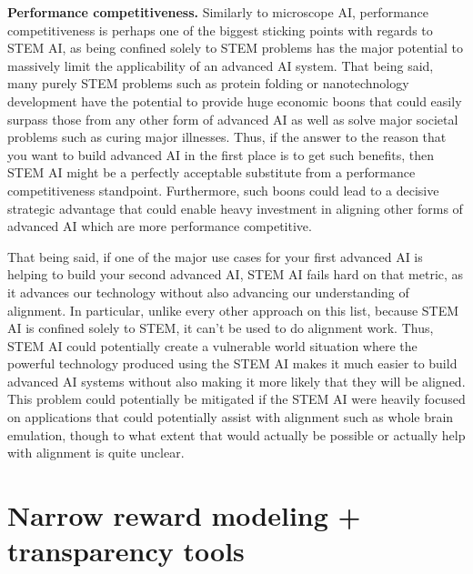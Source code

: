 \textbf{Performance competitiveness.} Similarly to microscope AI, performance competitiveness is perhaps one of the biggest sticking points with regards to STEM AI, as being confined solely to STEM problems has the major potential to massively limit the applicability of an advanced AI system. That being said, many purely STEM problems such as protein folding\cite{TODO: cite https://en.wikipedia.org/wiki/Protein_folding} or nanotechnology development\cite{TODO: cite https://en.wikipedia.org/wiki/Molecular_nanotechnology} have the potential to provide huge economic boons that could easily surpass those from any other form of advanced AI as well as solve major societal problems such as curing major illnesses. Thus, if the answer to the reason that you want to build advanced AI in the first place is to get such benefits, then STEM AI might be a perfectly acceptable substitute from a performance competitiveness standpoint. Furthermore, such boons could lead to a decisive strategic advantage\cite{TODO: cite https://www.lesswrong.com/posts/vkjWGJrFWBnzHtxrw/superintelligence-7-decisive-strategic-advantage} that could enable heavy investment in aligning other forms of advanced AI which are more performance competitive.

That being said, if one of the major use cases for your first advanced AI is helping to build your second advanced AI, STEM AI fails hard on that metric, as it advances our technology without also advancing our understanding of alignment. In particular, unlike every other approach on this list, because STEM AI is confined solely to STEM, it can't be used to do alignment work. Thus, STEM AI could potentially create a vulnerable world\cite{TODO: cite https://nickbostrom.com/papers/vulnerable.pdf} situation where the powerful technology produced using the STEM AI makes it much easier to build advanced AI systems without also making it more likely that they will be aligned. This problem could potentially be mitigated if the STEM AI were heavily focused on applications that could potentially assist with alignment such as whole brain emulation\cite{TODO: cite https://www.fhi.ox.ac.uk/brain-emulation-roadmap-report.pdf}, though to what extent that would actually be possible or actually help with alignment is quite unclear.

\section{Narrow reward modeling + transparency tools}
\label{sec:7}

